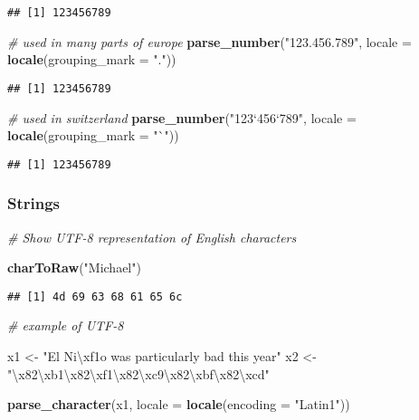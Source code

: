 \documentclass[]{article}
\newenvironment{Shaded}{\begin{snugshade}}{\end{snugshade}}
\newcommand{\KeywordTok}[1]{\textcolor[rgb]{0.13,0.29,0.53}{\textbf{#1}}}
\newcommand{\DataTypeTok}[1]{\textcolor[rgb]{0.13,0.29,0.53}{#1}}
\newcommand{\CharTok}[1]{\textcolor[rgb]{0.31,0.60,0.02}{#1}}
\newcommand{\StringTok}[1]{\textcolor[rgb]{0.31,0.60,0.02}{#1}}
\newcommand{\CommentTok}[1]{\textcolor[rgb]{0.56,0.35,0.01}{\textit{#1}}}
\newcommand{\NormalTok}[1]{#1}
\begin{document}
\begin{verbatim}
## [1] 123456789
\end{verbatim}

\begin{Shaded}
\begin{Highlighting}[]
\CommentTok{# used in many parts of europe}
\KeywordTok{parse_number}\NormalTok{(}\StringTok{"123.456.789"}\NormalTok{, }\DataTypeTok{locale =} \KeywordTok{locale}\NormalTok{(}\DataTypeTok{grouping_mark =} \StringTok{"."}\NormalTok{))}
\end{Highlighting}
\end{Shaded}

\begin{verbatim}
## [1] 123456789
\end{verbatim}

\begin{Shaded}
\begin{Highlighting}[]
\CommentTok{# used in switzerland}
\KeywordTok{parse_number}\NormalTok{(}\StringTok{"123`456`789"}\NormalTok{, }\DataTypeTok{locale =} \KeywordTok{locale}\NormalTok{(}\DataTypeTok{grouping_mark =} \StringTok{"`"}\NormalTok{))}
\end{Highlighting}
\end{Shaded}

\begin{verbatim}
## [1] 123456789
\end{verbatim}

\subsubsection{Strings}\label{strings}

\begin{Shaded}
\begin{Highlighting}[]
\CommentTok{# Show UTF-8 representation of English characters}

\KeywordTok{charToRaw}\NormalTok{(}\StringTok{"Michael"}\NormalTok{)}
\end{Highlighting}
\end{Shaded}

\begin{verbatim}
## [1] 4d 69 63 68 61 65 6c
\end{verbatim}

\begin{Shaded}
\begin{Highlighting}[]
\CommentTok{# example of UTF-8}

\NormalTok{x1 <-}\StringTok{ "El Ni}\CharTok{\textbackslash{}xf1}\StringTok{o was particularly bad this year"}
\NormalTok{x2 <-}\StringTok{ "}\CharTok{\textbackslash{}x82\textbackslash{}xb1\textbackslash{}x82\textbackslash{}xf1\textbackslash{}x82\textbackslash{}xc9\textbackslash{}x82\textbackslash{}xbf\textbackslash{}x82\textbackslash{}xcd}\StringTok{"}

\KeywordTok{parse_character}\NormalTok{(x1, }\DataTypeTok{locale =} \KeywordTok{locale}\NormalTok{(}\DataTypeTok{encoding =} \StringTok{"Latin1"}\NormalTok{))}
\end{Highlighting}
\end{Shaded}
\end{document}

